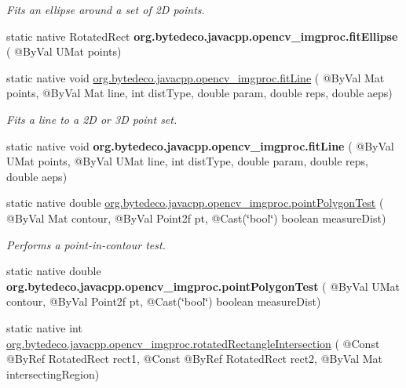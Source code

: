 \begin{DoxyCompactItemize}
\begin{DoxyCompactList}\small\item\em Fits an ellipse around a set of 2D points. \end{DoxyCompactList}\item 
\mbox{\label{group__imgproc__shape_ga4e86533eab74a1f956cd1db026edf8ed}} 
static native Rotated\+Rect {\bfseries org.\+bytedeco.\+javacpp.\+opencv\+\_\+imgproc.\+fit\+Ellipse} ( @By\+Val U\+Mat points)
\item 
static native void \hyperlink{group__imgproc__shape_ga081f0e410b01a81bbfe62c828ebb3c6f}{org.\+bytedeco.\+javacpp.\+opencv\+\_\+imgproc.\+fit\+Line} ( @By\+Val Mat points, @By\+Val Mat line, int dist\+Type, double param, double reps, double aeps)
\begin{DoxyCompactList}\small\item\em Fits a line to a 2D or 3D point set. \end{DoxyCompactList}\item 
\mbox{\label{group__imgproc__shape_ga6833c0216cb9d8be1efa71dbbd31db72}} 
static native void {\bfseries org.\+bytedeco.\+javacpp.\+opencv\+\_\+imgproc.\+fit\+Line} ( @By\+Val U\+Mat points, @By\+Val U\+Mat line, int dist\+Type, double param, double reps, double aeps)
\item 
static native double \hyperlink{group__imgproc__shape_gaf6f02003be04d7a37eff3af25946ff77}{org.\+bytedeco.\+javacpp.\+opencv\+\_\+imgproc.\+point\+Polygon\+Test} ( @By\+Val Mat contour, @By\+Val Point2f pt, @Cast(\char`\"{}bool\char`\"{}) boolean measure\+Dist)
\begin{DoxyCompactList}\small\item\em Performs a point-\/in-\/contour test. \end{DoxyCompactList}\item 
\mbox{\label{group__imgproc__shape_gab9b42bbdf409f7a8080d8fd2330dc8df}} 
static native double {\bfseries org.\+bytedeco.\+javacpp.\+opencv\+\_\+imgproc.\+point\+Polygon\+Test} ( @By\+Val U\+Mat contour, @By\+Val Point2f pt, @Cast(\char`\"{}bool\char`\"{}) boolean measure\+Dist)
\item 
static native int \hyperlink{group__imgproc__shape_gadcfa20fed89c804a31f05ae6e1023379}{org.\+bytedeco.\+javacpp.\+opencv\+\_\+imgproc.\+rotated\+Rectangle\+Intersection} ( @Const @By\+Ref Rotated\+Rect rect1, @Const @By\+Ref Rotated\+Rect rect2, @By\+Val Mat intersecting\+Region)

\end{DoxyCompactItemize}
